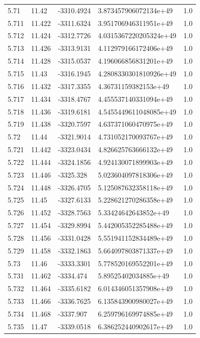 \begin{tabular}{lllll}
5.71 & 11.42 & -3310.4924 & 3.873457906072134e+49 & 1.0 \\
5.711 & 11.422 & -3311.6324 & 3.951706946311951e+49 & 1.0 \\
5.712 & 11.424 & -3312.7726 & 4.0315367220205324e+49 & 1.0 \\
5.713 & 11.426 & -3313.9131 & 4.112979166172406e+49 & 1.0 \\
5.714 & 11.428 & -3315.0537 & 4.196066856831201e+49 & 1.0 \\
5.715 & 11.43 & -3316.1945 & 4.2808330301810926e+49 & 1.0 \\
5.716 & 11.432 & -3317.3355 & 4.36731159382153e+49 & 1.0 \\
5.717 & 11.434 & -3318.4767 & 4.455537140331094e+49 & 1.0 \\
5.718 & 11.436 & -3319.6181 & 4.5455449611048085e+49 & 1.0 \\
5.719 & 11.438 & -3320.7597 & 4.637371060470975e+49 & 1.0 \\
5.72 & 11.44 & -3321.9014 & 4.731052170093767e+49 & 1.0 \\
5.721 & 11.442 & -3323.0434 & 4.826625763666132e+49 & 1.0 \\
5.722 & 11.444 & -3324.1856 & 4.924130071899903e+49 & 1.0 \\
5.723 & 11.446 & -3325.328 & 5.023604097818306e+49 & 1.0 \\
5.724 & 11.448 & -3326.4705 & 5.125087632358118e+49 & 1.0 \\
5.725 & 11.45 & -3327.6133 & 5.228621270286358e+49 & 1.0 \\
5.726 & 11.452 & -3328.7563 & 5.33424642643852e+49 & 1.0 \\
5.727 & 11.454 & -3329.8994 & 5.442005352285488e+49 & 1.0 \\
5.728 & 11.456 & -3331.0428 & 5.551941152834489e+49 & 1.0 \\
5.729 & 11.458 & -3332.1863 & 5.664097803871337e+49 & 1.0 \\
5.73 & 11.46 & -3333.3301 & 5.778520169552201e+49 & 1.0 \\
5.731 & 11.462 & -3334.474 & 5.89525402034885e+49 & 1.0 \\
5.732 & 11.464 & -3335.6182 & 6.014346051357908e+49 & 1.0 \\
5.733 & 11.466 & -3336.7625 & 6.135843900980027e+49 & 1.0 \\
5.734 & 11.468 & -3337.907 & 6.259796169974885e+49 & 1.0 \\
5.735 & 11.47 & -3339.0518 & 6.386252440902617e+49 & 1.0 \\

\end{tabular}
